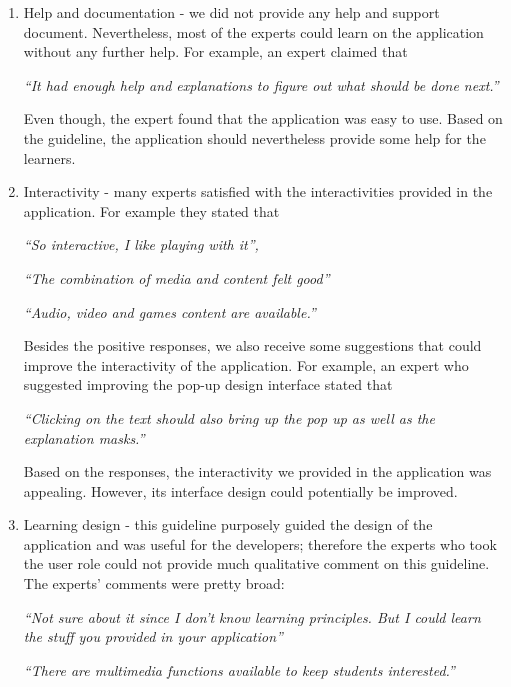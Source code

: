\begin{enumerate}
\item Help and documentation - we did not provide any help and support document. Nevertheless, most of the experts could learn on the application without any further help. For example, an expert claimed that  
\begin{addmargin}[1.5em]{1.5em}
\textit{``It had enough help and explanations to figure out what should be done next.''}\end{addmargin}

Even though, the expert found that the application was easy to use. Based on the guideline, the application should nevertheless provide some help for the learners. 

\item Interactivity - many experts satisfied with the interactivities provided in the application. For example they stated that 
\begin{addmargin}[1.5em]{1.5em}
\textit{``So interactive, I like playing with it'',}\end{addmargin}
\begin{addmargin}[1.5em]{1.5em}
\textit{``The combination of media and content felt good''}\end{addmargin}
\begin{addmargin}[1.5em]{1.5em}
\textit{``Audio, video and games content are available.''}\end{addmargin}

Besides the positive responses, we also receive some suggestions that could improve the interactivity of the application. For example, an expert who suggested improving the pop-up design interface stated that 
\begin{addmargin}[1.5em]{1.5em}
\textit{``Clicking on the text should also bring up the pop up as well as the explanation masks.''}\end{addmargin}

Based on the responses, the interactivity we provided in the application was appealing. However, its interface design could potentially be improved. 

\item Learning design - this guideline purposely guided the design of the application and was useful for the developers; therefore the experts who took the user role could not provide much qualitative comment on this guideline. The experts' comments were pretty broad: 
\begin{addmargin}[1.5em]{1.5em}
\textit{``Not sure about it since I don't know learning principles. But I could learn the stuff you provided in your application''}\end{addmargin}
\begin{addmargin}[1.5em]{1.5em}
\textit{``There are multimedia functions available to keep students interested.''}\end{addmargin} 


\end{enumerate}
